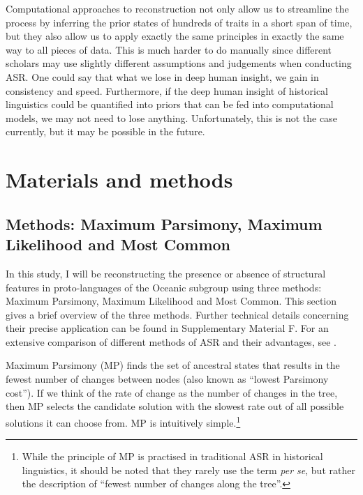 \documentclass[12pt,letterpaper]{article}
\begin{document}

Computational approaches to reconstruction not only allow us to streamline the process by inferring the prior states of hundreds of traits in a short span of time, but they also allow us to apply exactly the same principles in exactly the same way to all pieces of data. This is much harder to do manually since different scholars may use slightly different assumptions and judgements when conducting ASR. One could say that what we lose in deep human insight, we gain in consistency and speed. Furthermore, if the deep human insight of historical linguistics could be quantified into priors that can be fed into computational models, we may not need to lose anything. Unfortunately, this is not the case currently, but it may be possible in the future.


\FloatBarrier
\section{Materials and methods}
\subsection{Methods: Maximum Parsimony, Maximum Likelihood and Most Common}
\label{sec:MP_ML_MC}
In this study, I will be reconstructing the presence or absence of structural features in proto-languages of the Oceanic subgroup using three methods: Maximum Parsimony, Maximum Likelihood and Most Common. This section gives a brief overview of the three methods. Further technical details concerning their precise application can be found in Supplementary Material F. For an extensive comparison of different methods of ASR and their advantages, see \citet{joy2016ancestral}.

Maximum Parsimony (MP) finds the set of ancestral states that results in the fewest number of changes between nodes (also known as ``lowest Parsimony cost''). If we think of the rate of change as the number of changes in the tree, then MP selects the candidate solution with the slowest rate out of all possible solutions it can choose from. MP is intuitively simple.\footnote{While the principle of MP is practised in traditional ASR in historical linguistics, it should be noted that they rarely use the term \textit{per se}, but rather the description of ``fewest number of changes along the tree''.}
\end{document}
